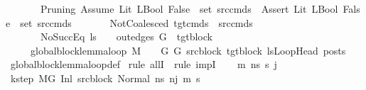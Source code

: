 \begin{isabellebody}
\ \ \ \ \ \ \ Pruning{\isacharcolon}{\kern0pt}\ {\isachardoublequoteopen}{\isacharparenleft}{\kern0pt}Assume\ {\isacharparenleft}{\kern0pt}Lit\ {\isacharparenleft}{\kern0pt}LBool\ False{\isacharparenright}{\kern0pt}{\isacharparenright}{\kern0pt}{\isacharparenright}{\kern0pt}\ {\isasymin}\ set\ {\isacharparenleft}{\kern0pt}src{\isacharunderscore}{\kern0pt}cmds{\isacharparenright}{\kern0pt}\ {\isasymor}\ {\isacharparenleft}{\kern0pt}Assert\ {\isacharparenleft}{\kern0pt}Lit\ {\isacharparenleft}{\kern0pt}LBool\ False{\isacharparenright}{\kern0pt}{\isacharparenright}{\kern0pt}{\isacharparenright}{\kern0pt}\ {\isasymin}\ set\ {\isacharparenleft}{\kern0pt}src{\isacharunderscore}{\kern0pt}cmds{\isacharparenright}{\kern0pt}{\isachardoublequoteclose}\isanewline
\ \ \ \ \ \ \ NotCoalesced{\isacharcolon}{\kern0pt}\ {\isachardoublequoteopen}tgt{\isacharunderscore}{\kern0pt}cmds\ {\isacharequal}{\kern0pt}\ src{\isacharunderscore}{\kern0pt}cmds{\isachardoublequoteclose}\isanewline
\ \ \ \ \ \ \ NoSuccEq{\isacharcolon}{\kern0pt}\ {\isachardoublequoteopen}ls\ {\isacharequal}{\kern0pt}\ {\isacharbrackleft}{\kern0pt}{\isacharbrackright}{\kern0pt}\ {\isasymLongrightarrow}\ out{\isacharunderscore}{\kern0pt}edges\ G{\isacharprime}{\kern0pt}\ {\isacharbang}{\kern0pt}\ tgt{\isacharunderscore}{\kern0pt}block\ {\isacharequal}{\kern0pt}\ {\isacharbrackleft}{\kern0pt}{\isacharbrackright}{\kern0pt}{\isachardoublequoteclose}\isanewline
\ \ \ \ \ {\isachardoublequoteopen}global{\isacharunderscore}{\kern0pt}block{\isacharunderscore}{\kern0pt}lemma{\isacharunderscore}{\kern0pt}loop\ M\ {\isasymLambda}\ {\isasymGamma}\ {\isasymOmega}\ G\ G{\isacharprime}{\kern0pt}\ src{\isacharunderscore}{\kern0pt}block\ tgt{\isacharunderscore}{\kern0pt}block\ lsLoopHead\ posts{\isachardoublequoteclose}\isanewline
%
\isadelimproof
\ \ %
\endisadelimproof
%
\isatagproof
{}\isamarkupfalse%
\ global{\isacharunderscore}{\kern0pt}block{\isacharunderscore}{\kern0pt}lemma{\isacharunderscore}{\kern0pt}loop{\isacharunderscore}{\kern0pt}def\isanewline
{}\isamarkupfalse%
\ {\isacharparenleft}{\kern0pt}rule\ allI\ {\isacharbar}{\kern0pt}\ rule\ impI{\isacharparenright}{\kern0pt}{\isacharplus}{\kern0pt}\isanewline
\ \ \isamarkupfalse%
\ m{\isacharprime}{\kern0pt}\ ns\ s{\isacharprime}{\kern0pt}\ j\isanewline
\ \ \isamarkupfalse%
\ k{\isacharunderscore}{\kern0pt}step{\isacharcolon}{\kern0pt}\ {\isachardoublequoteopen}M{\isacharcomma}{\kern0pt}{\isasymLambda}{\isacharcomma}{\kern0pt}{\isasymGamma}{\isacharcomma}{\kern0pt}{\isasymOmega}{\isacharcomma}{\kern0pt}G\ {\isasymturnstile}{\isacharparenleft}{\kern0pt}Inl\ src{\isacharunderscore}{\kern0pt}block{\isacharcomma}{\kern0pt}\ Normal\ ns{\isacharparenright}{\kern0pt}\ {\isacharminus}{\kern0pt}n{\isasymrightarrow}{\isacharcircum}{\kern0pt}j\ {\isacharparenleft}{\kern0pt}m{\isacharprime}{\kern0pt}{\isacharcomma}{\kern0pt}\ s{\isacharprime}{\kern0pt}{\isacharparenright}{\kern0pt}{\isachardoublequoteclose}\ \isanewline

\end{isabellebody}
